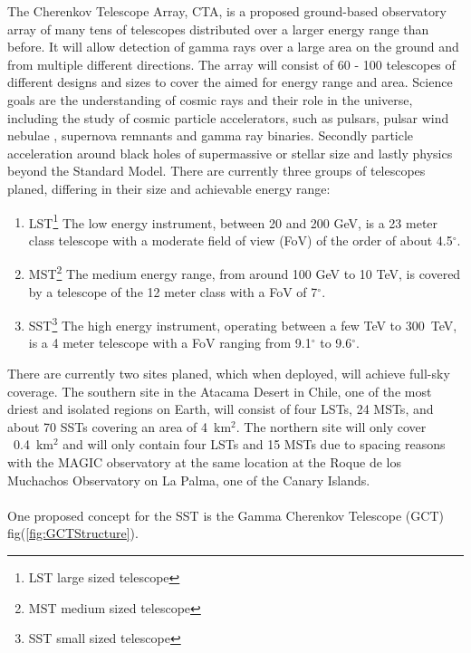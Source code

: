 \documentclass[12pt,article,type=msc,colorback,accentcolor=tud9c]{tudthesis}
\begin{document}
The Cherenkov Telescope Array, CTA, is a proposed ground-based observatory array of many tens of telescopes distributed over a larger energy range than before. It will allow detection of gamma rays over a large area on the ground and from multiple different directions. The array will consist of 60 - 100 telescopes of different designs and sizes to cover the aimed for energy range and area. Science goals are the understanding of cosmic rays and their role in the universe, including the study of cosmic particle accelerators, such as pulsars, pulsar wind nebulae , supernova remnants and gamma ray binaries. Secondly particle acceleration around black holes of supermassive or stellar size and lastly physics beyond the Standard Model. 
There are currently three groups of telescopes planed, differing in their size and achievable energy range:\cite{CTADesign}
\begin{enumerate}
\item LST\footnote{LST large sized telescope} The low energy instrument, between 20 and 200 GeV, is a 23 meter class telescope with a moderate field of view (FoV) of the order of about 4.5$^\circ$.
\item MST\footnote{MST medium sized telescope} The medium energy range, from around 100 GeV to 10 TeV, is covered by a telescope of the 12 meter class with a FoV of 7$^\circ$.
\item SST\footnote{SST small sized telescope} The high energy instrument, operating between a few TeV to 300~TeV, is a 4 meter telescope with a FoV ranging from 9.1$^\circ$ to 9.6$^\circ$.
\end{enumerate}
There are currently two sites planed, which when deployed, will achieve full-sky coverage. The southern site in the Atacama Desert in Chile, one of the most driest and isolated regions on Earth, will consist of four LSTs, 24 MSTs, and about 70 SSTs covering an area of 4~km$^2$. The northern site will only cover ~0.4~km$^2$ and will only contain four LSTs and 15 MSTs due to spacing reasons with the MAGIC observatory at the same location at the Roque de los Muchachos Observatory on La Palma, one of the Canary Islands.\\\\
\noindent
One proposed concept for the SST is the Gamma Cherenkov Telescope (GCT) fig(\ref{fig:GCTStructure}).\\
\end{document}
